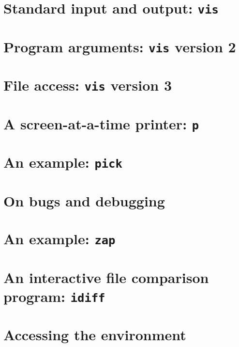 \section{Standard input and output: \texttt{vis}}
\section{Program arguments: \texttt{vis} version 2}
\section{File access: \texttt{vis} version 3}
\section{A screen-at-a-time printer: \texttt{p}}
\section{An example: \texttt{pick}}
\section{On bugs and debugging}
\section{An example: \texttt{zap}}
\section{An interactive file comparison program: \texttt{idiff}}
\section{Accessing the environment}
